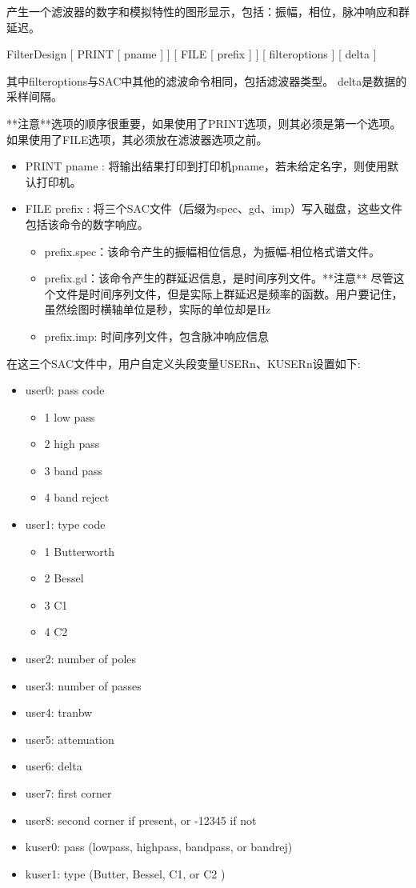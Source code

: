 \label{cmd:filterdesign}

产生一个滤波器的数字和模拟特性的图形显示，包括：振幅，相位，脉冲响应和群延迟。

FilterDesign [ PRINT [ pname ] ] [ FILE [ prefix ] ] [ filteroptions ] [ delta ]

其中filteroptions与SAC中其他的滤波命令相同，包括滤波器类型。
delta是数据的采样间隔。

**注意**选项的顺序很重要，如果使用了PRINT选项，则其必须是第一个选项。如果使用了FILE选项，其必须放在滤波器选项之前。

\begin{itemize}
\item PRINT pname : 将输出结果打印到打印机pname，若未给定名字，则使用默认打印机。
\item FILE prefix : 将三个SAC文件（后缀为spec、gd、imp）写入磁盘，这些文件包括该命令的数字响应。 
	\begin{itemize}
	\item prefix.spec：该命令产生的振幅相位信息，为振幅-相位格式谱文件。
	\item prefix.gd：该命令产生的群延迟信息，是时间序列文件。**注意** 尽管这个文件是时间序列文件，但是实际上群延迟是频率的函数。用户要记住，虽然绘图时横轴单位是秒，实际的单位却是Hz
	\item prefix.imp: 时间序列文件，包含脉冲响应信息
	\end{itemize}
\end{itemize}

在这三个SAC文件中，用户自定义头段变量USERn、KUSERn设置如下:
\begin{itemize}
\item user0:  pass code
	\begin{itemize}
	\item 1 low pass
	\item 2 high pass
 	\item 3 band pass
	\item 4 band reject
	\end{itemize}
\item user1:  type code
	\begin{itemize}
	\item 1 Butterworth
	\item 2 Bessel
	\item 3 C1
	\item 4 C2
	\end{itemize}
\item user2:  number of poles
\item user3:  number of passes
\item user4:  tranbw
\item user5:  attenuation
\item user6:  delta
\item user7:  first corner
\item user8:  second corner if present, or -12345 if not
\item kuser0: pass (lowpass, highpass, bandpass, or bandrej)
\item kuser1: type (Butter, Bessel, C1, or C2 )
\end{itemize}

